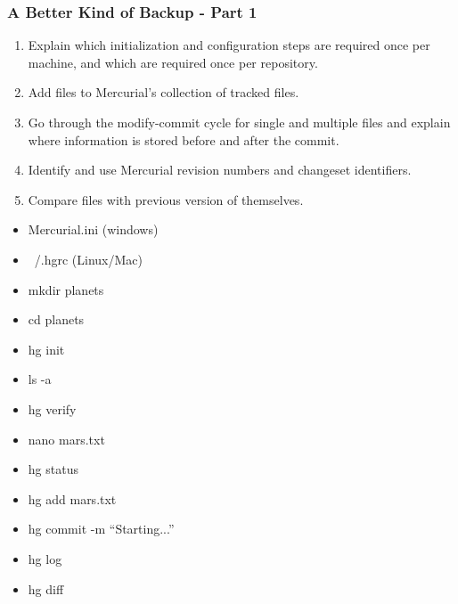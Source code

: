 \documentclass[xcolor=dvipsnames]{beamer}
\begin{document}
\begin{frame}
\frametitle{A Better Kind of Backup - Part 1}
\begin{enumerate}
\item Explain which initialization and configuration steps are required once per machine, and which are required once per repository.
\item Add files to Mercurial's collection of tracked files.
\item Go through the modify-commit cycle for single and multiple files and explain where information is stored before and after the commit.
\item Identify and use Mercurial revision numbers and changeset identifiers.
\item Compare files with previous version of themselves.
\end{enumerate}

\begin{multicols}{2}
\begin{itemize}
\item Mercurial.ini (windows)
\item ~/.hgrc (Linux/Mac)
\item mkdir planets
\item cd planets
\item hg init
\item ls -a
\item hg verify
\item nano mars.txt
\item hg status
\item hg add mars.txt
\item hg commit -m ``Starting...''
\item hg log
\item hg diff
\end{itemize}
\end{multicols}
\end{frame}
\end{document}
